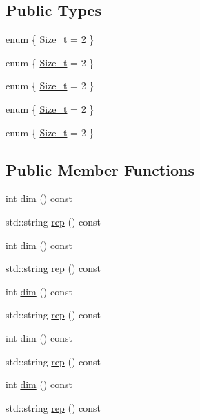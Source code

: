 \subsection*{Public Types}
\begin{DoxyCompactItemize}
\item 
enum \{ \mbox{\hyperlink{structHadron_1_1M__sym__t_a2e06171638260bfc4e02437d47d27d28a89b69a9b3569a16794a38da9585da200}{Size\+\_\+t}} = 2
 \}
\item 
enum \{ \mbox{\hyperlink{structHadron_1_1M__sym__t_a2e06171638260bfc4e02437d47d27d28a89b69a9b3569a16794a38da9585da200}{Size\+\_\+t}} = 2
 \}
\item 
enum \{ \mbox{\hyperlink{structHadron_1_1M__sym__t_a2e06171638260bfc4e02437d47d27d28a89b69a9b3569a16794a38da9585da200}{Size\+\_\+t}} = 2
 \}
\item 
enum \{ \mbox{\hyperlink{structHadron_1_1M__sym__t_a2e06171638260bfc4e02437d47d27d28a89b69a9b3569a16794a38da9585da200}{Size\+\_\+t}} = 2
 \}
\item 
enum \{ \mbox{\hyperlink{structHadron_1_1M__sym__t_a2e06171638260bfc4e02437d47d27d28a89b69a9b3569a16794a38da9585da200}{Size\+\_\+t}} = 2
 \}
\end{DoxyCompactItemize}
\subsection*{Public Member Functions}
\begin{DoxyCompactItemize}
\item 
int \mbox{\hyperlink{structHadron_1_1M__sym__t_a9ee8ba6fd6c2220231052690b2995ed5}{dim}} () const
\item 
std\+::string \mbox{\hyperlink{structHadron_1_1M__sym__t_ad90bc816709bb65ec3e0b804090fbefe}{rep}} () const
\item 
int \mbox{\hyperlink{structHadron_1_1M__sym__t_a9ee8ba6fd6c2220231052690b2995ed5}{dim}} () const
\item 
std\+::string \mbox{\hyperlink{structHadron_1_1M__sym__t_ad90bc816709bb65ec3e0b804090fbefe}{rep}} () const
\item 
int \mbox{\hyperlink{structHadron_1_1M__sym__t_a9ee8ba6fd6c2220231052690b2995ed5}{dim}} () const
\item 
std\+::string \mbox{\hyperlink{structHadron_1_1M__sym__t_ad90bc816709bb65ec3e0b804090fbefe}{rep}} () const
\item 
int \mbox{\hyperlink{structHadron_1_1M__sym__t_a9ee8ba6fd6c2220231052690b2995ed5}{dim}} () const
\item 
std\+::string \mbox{\hyperlink{structHadron_1_1M__sym__t_ad90bc816709bb65ec3e0b804090fbefe}{rep}} () const
\item 
int \mbox{\hyperlink{structHadron_1_1M__sym__t_a9ee8ba6fd6c2220231052690b2995ed5}{dim}} () const
\item 
std\+::string \mbox{\hyperlink{structHadron_1_1M__sym__t_ad90bc816709bb65ec3e0b804090fbefe}{rep}} () const
\end{DoxyCompactItemize}


